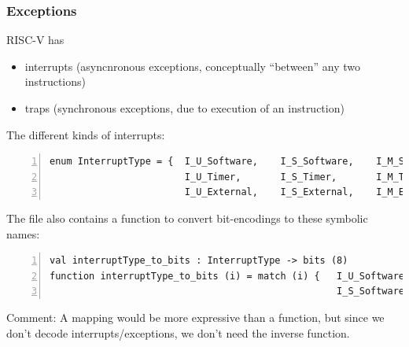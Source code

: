 \documentclass[aspectratio=169]{beamer}
\newcommand{\slidefont}{\scriptsize}
\begin{document}
\begin{frame}[fragile]
  \frametitle{Exceptions}

  \slidefont

  RISC-V has
  \begin{itemize}
  \item interrupts (asyncnronous exceptions, conceptually ``between'' any two instructions)
  \item traps (synchronous exceptions, due to execution of an instruction)
  \end{itemize}

  \vspace{1ex}

  The different kinds of interrupts:

  \vspace{1ex}

  \begin{Verbatim}[frame=single, numbers=left, label = File riscv\_types.sail]
enum InterruptType = {  I_U_Software,    I_S_Software,    I_M_Software,
                        I_U_Timer,       I_S_Timer,       I_M_Timer,
                        I_U_External,    I_S_External,    I_M_External    }
  \end{Verbatim}

  The file also contains a function to convert bit-encodings to these symbolic names:

  \vspace{1ex}

  \begin{Verbatim}[frame=single, numbers=left, label = File riscv\_types.sail]
val interruptType_to_bits : InterruptType -> bits (8)
function interruptType_to_bits (i) = match (i) {   I_U_Software => 0x00,
                                                   I_S_Software => 0x01,  ... }
  \end{Verbatim}

  Comment: A mapping would be more expressive than a function, but
  since we don't decode interrupts/exceptions, we don't need the inverse
  function.

\end{frame}

\end{document}
